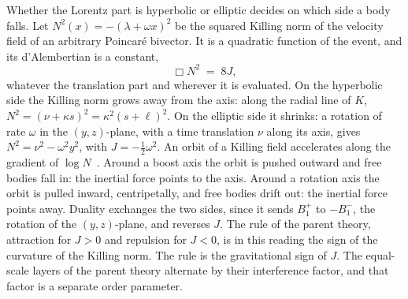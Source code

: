 \documentclass[a4paper]{article}
\begin{document}
Whether the Lorentz part is hyperbolic or elliptic decides on which side a body falls. Let \(N^{2}(x)=-(\lambda+\omega x)^{2}\) be the squared Killing norm of the velocity field of an arbitrary Poincar\'{e} bivector. It is a quadratic function of the event, and its d'Alembertian is a constant,
\begin{equation}
\Box N^{2} \;=\; 8J,
\label{eq:dalembert-J}
\end{equation}
whatever the translation part and wherever it is evaluated. On the hyperbolic side the Killing norm grows away from the axis: along the radial line of \(K\), \(N^{2}=(\nu+\kappa s)^{2}=\kappa^{2}(s+\ell)^{2}\). On the elliptic side it shrinks: a rotation of rate \(\omega\) in the \((y,z)\)-plane, with a time translation \(\nu\) along its axis, gives \(N^{2}=\nu^{2}-\omega^{2}y^{2}\), with \(J=-\tfrac12\omega^{2}\). An orbit of a Killing field accelerates along the gradient of \(\log N\)~\cite{Wald1984}. Around a boost axis the orbit is pushed outward and free bodies fall in: the inertial force points to the axis. Around a rotation axis the orbit is pulled inward, centripetally, and free bodies drift out: the inertial force points away. Duality exchanges the two sides, since it sends \(B^{+}_{1}\) to \(-B^{-}_{1}\), the rotation of the \((y,z)\)-plane, and reverses \(J\). The rule of the parent theory, attraction for \(J>0\) and repulsion for \(J<0\), is in this reading the sign of the curvature of the Killing norm. The rule is the gravitational sign of \(J\). The equal-scale layers of the parent theory alternate by their interference factor, and that factor is a separate order parameter.
\end{document}
